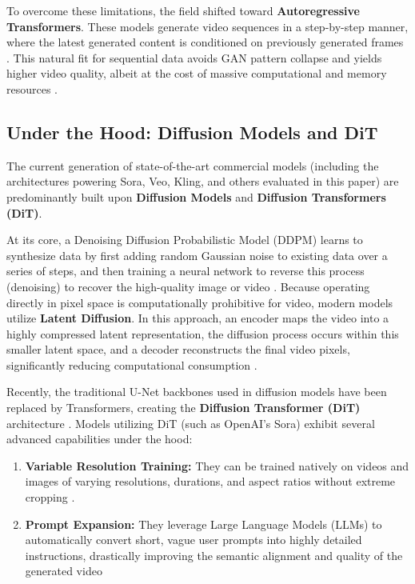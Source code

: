 \documentclass[sigconf]{acmart}
\begin{document}
To overcome these limitations, the field shifted toward \textbf{Autoregressive Transformers}. These models generate video sequences in a step-by-step manner, where the latest generated content is conditioned on previously generated frames \cite{xie2025comprehensive}. This natural fit for sequential data avoids GAN pattern collapse and yields higher video quality, albeit at the cost of massive computational and memory resources \cite{xie2025comprehensive}.

\subsection{Under the Hood: Diffusion Models and DiT}
The current generation of state-of-the-art commercial models (including the architectures powering Sora, Veo, Kling, and others evaluated in this paper) are predominantly built upon \textbf{Diffusion Models} and \textbf{Diffusion Transformers (DiT)}.

At its core, a Denoising Diffusion Probabilistic Model (DDPM) learns to synthesize data by first adding random Gaussian noise to existing data over a series of steps, and then training a neural network to reverse this process (denoising) to recover the high-quality image or video \cite{xie2025comprehensive}. Because operating directly in pixel space is computationally prohibitive for video, modern models utilize \textbf{Latent Diffusion}. In this approach, an encoder maps the video into a highly compressed latent representation, the diffusion process occurs within this smaller latent space, and a decoder reconstructs the final video pixels, significantly reducing computational consumption \cite{xie2025comprehensive}.

Recently, the traditional U-Net backbones used in diffusion models have been replaced by Transformers, creating the \textbf{Diffusion Transformer (DiT)} architecture \cite{xie2025comprehensive}. Models utilizing DiT (such as OpenAI's Sora) exhibit several advanced capabilities under the hood:
\begin{enumerate}
    \item \textbf{Variable Resolution Training:} They can be trained natively on videos and images of varying resolutions, durations, and aspect ratios without extreme cropping \cite{xie2025comprehensive}.
    \item \textbf{Prompt Expansion:} They leverage Large Language Models (LLMs) to automatically convert short, vague user prompts into highly detailed instructions, drastically improving the semantic alignment and quality of the generated video \cite{xie2025comprehensive}
\end{enumerate}
\end{document}
